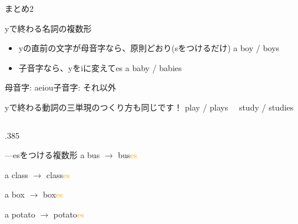 \documentclass[aspectratio=169,xcolor={dvipsnames,table}]{beamer}
\begin{document}
\begin{frame}[plain]{まとめ2}
  \begin{block}{yで終わる名詞の複数形}\small
    \begin{itemize}[square]
      \item yの直前の文字が母音字なら、原則どおり(sをつけるだけ)%
            \hfill{\scriptsize a boy / boys}
      \item \phantom{yの直前の文字が}子音字なら、yをiに変えてes
            \hfill{\scriptsize a baby / babies}
    \end{itemize}
    \hfill{\scriptsize 母音字: aeiou\hspace{10pt}子音字: それ以外}
  \end{block}

  \vspace*{-15pt}
  \hfill{\scriptsize yで終わる動詞の三単現のつくり方も同じです！ play / plays\,\,\,\,\,\,\,\,study / studies}


  \vspace*{-10pt}
  \pause

  \begin{columns}
    \begin{column}[t]{.385\textwidth}
      \begin{block}{---esをつける複数形}\small
        a bus $\longrightarrow$ bus\textcolor{orange}{es}%
        \hfill{}\hspace*{15pt}

        a class $\longrightarrow$ class\textcolor{orange}{es}
        \hfill{}\hspace*{15pt}

        a box  $\longrightarrow$ box\textcolor{orange}{es}
        \hfill{}\hspace*{15pt}

        a potato $\longrightarrow$ potato\textcolor{orange}{es}
        \hfill{}\hspace*{15pt}


\end{block}
\end{column}
\end{columns}
\end{frame}
\end{document}

